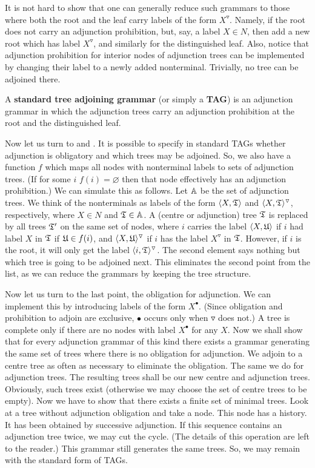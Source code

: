 It is not hard to show that one can generally reduce such grammars 
to those where both the root and the leaf carry labels of the form
$X^{\triangledown}$. Namely, if the root does not carry an adjunction 
prohibition, but, say, a label $X \in N$, then add a new root which has 
label $X^{\triangledown}$, and similarly for the distinguished leaf.
Also, notice that adjunction prohibition for interior nodes of 
adjunction trees can be implemented by changing their label to a 
newly added nonterminal. Trivially, no tree can be adjoined there.
\begin{defn}
A \textbf{standard tree adjoining grammar} (or simply a \textbf{TAG}) 
is an adjunction grammar in which the adjunction trees carry an
adjunction prohibition at the root and the distinguished leaf.
\end{defn}
Now let us turn to  and . It is possible to 
specify in standard TAGs whether adjunction is obligatory and 
which trees may be adjoined. So, we also have a function $f$ which 
maps all nodes with nonterminal labels to sets of adjunction trees. 
(If for some $i$ $f(i) = \varnothing$ then that node effectively 
has an adjunction prohibition.) We can simulate this as follows.
Let $\mathbb{A}$ be the set of adjunction trees. We think of the
nonterminals as labels of the form $\langle X, \mathfrak{T}\rangle$
and $\langle X, \mathfrak{T}\rangle^{\triangledown}$, respectively, where $X \in N$
and $\mathfrak{T} \in \mathbb{A}$. A (centre or adjunction) tree $\mathfrak{T}$ is replaced 
by all trees $\mathfrak{T}'$ on the same set of nodes, where $i$ carries
the label $\langle X,\mathfrak{U}\rangle$ if $i$ had label $X$ in $\mathfrak{T}$ if
$\mathfrak{U} \in f(i)$, and $\langle X,\mathfrak{U}\rangle^{\triangledown}$ if
$i$ has the label $X^{\triangledown}$ in $\mathfrak{T}$. However, if $i$ 
is the root, it will only get the label $\langle i, \mathfrak{T}\rangle^{\triangledown}$. 
The second element says nothing but which tree is going to be 
adjoined next. This eliminates the second point from the list, 
as we can reduce the grammars by keeping the tree structure.

Now let us turn to the last point, the obligation for adjunction.
We can implement this by introducing labels of the form
$X^{\bullet}$.  (Since obligation and prohibition to adjoin
are exclusive, $\bullet$ occurs only when $\triangledown$ does not.)
A tree is complete only if there are no nodes with label
$X^{\bullet}$ for any $X$. Now we shall show that for every adjunction
grammar of this kind there exists a grammar generating the same
set of trees where there is no obligation for adjunction.
We adjoin to a centre tree as often as necessary to
eliminate the obligation. The same we do for adjunction trees.
The resulting trees shall be our new centre and adjunction
trees. Obviously, such trees exist (otherwise we may choose
the set of centre trees to be empty). Now we have to show that
there exists a finite set of minimal trees. Look at a tree
without adjunction obligation and take a node. This node
has a history. It has been obtained by successive adjunction.
If this sequence contains an adjunction tree twice, we may
cut the cycle. (The details of this operation are left to the
reader.) This grammar still generates the same trees. So,
we may remain with the standard form of TAGs.

